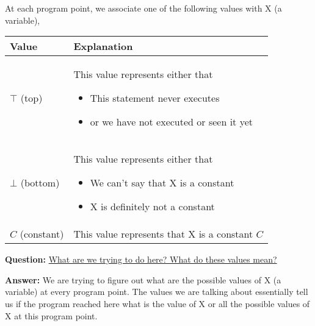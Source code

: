 At each program point, we associate one of the following values with X (a variable),
\begin{center}
    \begin{tabular}{| m{2cm} | m{7cm} |}
        \hline
        Value & Explanation \\
        \hline
        $\top$ (top) &
        This value represents either that
        \begin{itemize} 
            \item This statement never executes
            \item or we have not executed or seen it yet
        \end{itemize}\\
        \hline
        $\bot$ (bottom) &
        This value represents either that
        \begin{itemize} 
            \item We can't say that X is a constant
            \item X is definitely not a constant
        \end{itemize}\\
        \hline
        $C$ (constant) &
        This value represents that X is a constant $C$\\
        \hline
    \end{tabular}
\end{center}

\vspace{0.5cm}

\textbf{Question:} \underline{What are we trying to do here? What do these values mean?}

\vspace{0.3cm}

\textbf{Answer:} We are trying to figure out what are the possible values of X (a variable) at every program point. The values we are talking about essentially tell us if the program reached here what is the value of X or all the possible values of X at this program point.

